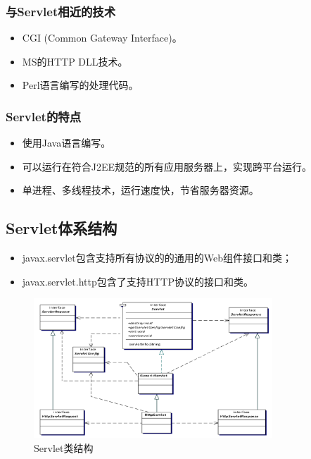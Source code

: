 \subsubsection{与Servlet相近的技术}

\begin{itemize}
\item CGI (Common Gateway Interface)。
\item MS的HTTP DLL技术。
\item Perl语言编写的处理代码。
\end{itemize}

\subsubsection{Servlet的特点}

\begin{itemize}
\item 使用Java语言编写。
\item 可以运行在符合J2EE规范的所有应用服务器上，实现跨平台运行。
\item 单进程、多线程技术，运行速度快，节省服务器资源。
\end{itemize}

\subsection{Servlet体系结构}

\begin{itemize}
\item javax.servlet包含支持所有协议的的通用的Web组件接口和类；
\item javax.servlet.http包含了支持HTTP协议的接口和类。
\end{itemize}

\begin{figure}[htb]
\centering
\includegraphics[width=0.8\textwidth]{images/JavaEE-servlet-programming/fig-sevlet-class-map.png}
\caption{Servlet类结构}
\label{fig:sevlet-class-map}
\end{figure}

